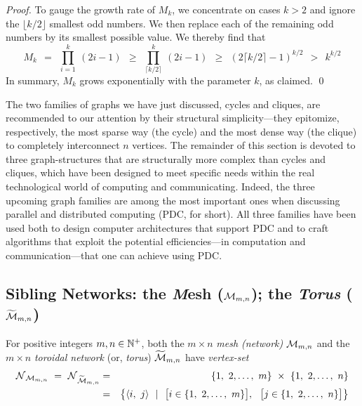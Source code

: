 \begin{proof}
\hspace*{.25in}{\em $M_k$ is the product of the first $k$ odd numbers.}

\noindent
To gauge the growth rate of $M_k$, we concentrate on cases $k > 2$ and
ignore the $\lfloor k/2 \rfloor$ smallest odd numbers.  We then
replace each of the remaining odd numbers by its smallest possible
value.  We thereby find that
\[
M_k \ \ =    \ \ \prod_{i=1}^k \ (2i-1)
    \ \ \geq \ \ \prod_{\lceil k/2 \rceil}^k \ (2i-1)
    \ \ \geq \ \ \left( 2 \lceil k/2 \rceil -1 \right)^{k/2}
    \ \ >    \ \ k^{k/2}
\]
In summary, $M_k$ grows exponentially with the parameter $k$, as claimed.
\qed
\end{proof}


\bigskip

The two families of graphs we have just discussed, cycles and cliques,
are recommended to our attention by their structural simplicity---they
epitomize, respectively, the most sparse way (the cycle) and the most
dense way (the clique) to completely interconnect $n$ vertices.  The
remainder of this section is devoted to three graph-structures that
are structurally more complex than cycles and cliques, which have been
designed to meet specific needs within the real technological world of
computing and communicating.  Indeed, the three upcoming graph
families are among the most important ones when discussing parallel
and distributed computing (PDC, for short).  All three families have
been used both to design computer architectures that support PDC and
to craft algorithms that exploit the potential efficiencies---in
computation and communication---that one can achieve using PDC.

\subsection{Sibling Networks: the {\it M}esh ($\mbox{$\cal M$}_{m,n}$); the {\it Torus} ($\widetilde{\mbox{$\cal M$}}_{m,n}$)}
\label{sec:mesh}

For positive integers $m, n \in \mathbb{N}^+$, both the $m \times n$ {\it mesh
  (network)} $\mbox{$\cal M$}_{m,n}$ and the $m \times n$ {\it toroidal network}
(or, {\it torus}) $\widetilde{\mbox{$\cal M$}}_{m,n}$ have {\it vertex-set}
\begin{eqnarray*}
\n_{\fm_{m,n}} \ = \ \n_{\widetilde{\fm}_{m,n}}
  & = & 
\{1, \ 2, \ldots, \ m\} \ \times \ \{1, \ 2, \ldots, \ n\} \\
  & = & 
\big\{ \langle i, \ j \rangle \ \ | \ \ 
\big[ i \in \{1, \ 2, \ldots, \ m\} \big], \ \
\big[ j \in \{1, \ 2, \ldots, \ n\} \big]
\big\}
\end{eqnarray*}

